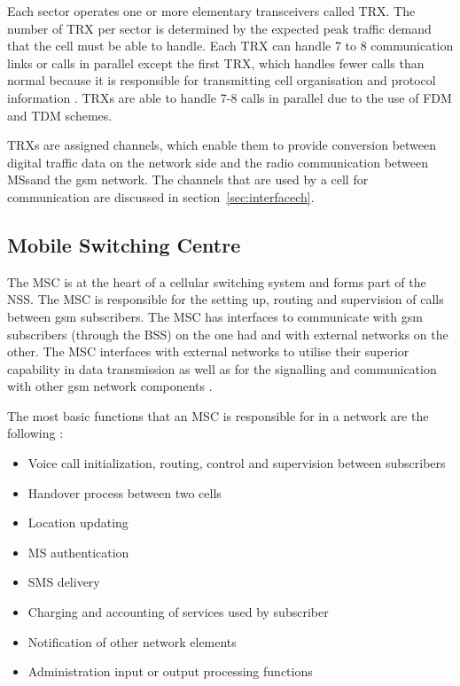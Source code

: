 Each sector operates one or more elementary transceivers called \gls{TRX}. The number of \gls{TRX} per sector is determined by the expected peak traffic demand that the cell must be able to handle. Each \gls{TRX} can handle 7 to 8 communication links or calls in parallel except the first \gls{TRX}, which handles fewer calls than normal because it is responsible for transmitting cell organisation and protocol information \cite{Eisenblatter}. \glspl{TRX} are able to handle 7-8 calls in parallel due to the use of \gls{FDM} and \gls{TDM} schemes. 

\glspl{TRX} are assigned channels, which enable them to provide conversion between digital traffic data on the network side and the radio communication between \glspl{MS}and the \gls{gsm} network\cite{ACOvsEA,FAPOrientationModel}. The channels that are used by a cell for communication are discussed in section~\ref{sec:interfacech}.

\subsection{Mobile Switching Centre}

The \gls{MSC} is at the heart of a cellular switching system and forms part of the \gls{NSS}. The \gls{MSC} is responsible for the setting up, routing and supervision of calls between \gls{gsm} subscribers\cite{GSM92,GSMSysEngin}. The \gls{MSC} has interfaces to communicate with \gls{gsm} subscribers (through the \gls{BSS}) on the one had and with external networks on the other\cite{GSM92}. The \gls{MSC} interfaces with external networks to utilise their superior capability in data transmission as well as for the signalling and communication with other \gls{gsm} network components \cite{GSM92}. 

The most basic functions that an \gls{MSC} is responsible for in a network are the following \cite{wirelesstelcoMullet}:
\begin{itemize}
\item Voice call initialization, routing, control and supervision between subscribers
\item Handover process between two cells
\item Location updating
\item \gls{MS} authentication
\item \gls{SMS} delivery
\item Charging and accounting of services used by subscriber
\item Notification of other network elements
\item Administration input or output processing functions
\end{itemize}

